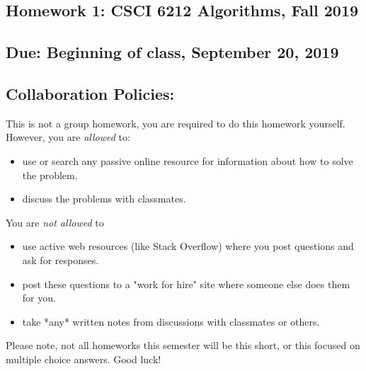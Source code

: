 \documentclass[11pt,letterpaper]{article}
\begin{document}
\begin{center}
\section*{Homework 1: CSCI 6212 Algorithms, Fall 2019}    
\end{center}
\subsection*{Due: Beginning of class, September 20, 2019}

    \subsection*{Collaboration Policies:} This is not a group homework, you are required to do this homework yourself.  However, you are {\em allowed} to:
    \begin{itemize} 
    \item use or search any passive online resource for information about how to solve the problem.  
    \item discuss the problems with classmates.  
    \end{itemize}
    You are {\em not allowed} to
    \begin{itemize} 
    \item use active web resources (like Stack Overflow) where you post questions and ask for responses.
    \item post these questions to a "work for hire" site where someone else does them for you.
    \item take *any* written notes from discussions with classmates or others. 
    \end{itemize}

Please note, not all homeworks this semester will be this short, or this focused on multiple choice answers.  Good luck!
\end{document}
